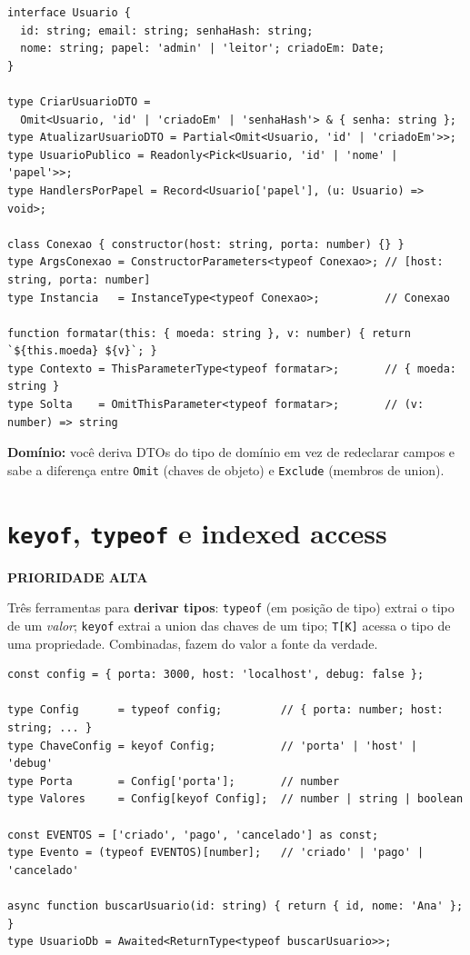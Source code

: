 \documentclass[12pt,a4paper,oneside]{book}
\newcommand{\alta}{\colorbox{red!15}{\sffamily\scriptsize\bfseries PRIORIDADE ALTA}}
\newcommand{\code}[1]{\texttt{#1}}
\newcommand{\dom}[1]{\begin{dominio}\textbf{Domínio:} #1\end{dominio}}
\begin{document}
\begin{verbatim}
interface Usuario {
  id: string; email: string; senhaHash: string;
  nome: string; papel: 'admin' | 'leitor'; criadoEm: Date;
}

type CriarUsuarioDTO =
  Omit<Usuario, 'id' | 'criadoEm' | 'senhaHash'> & { senha: string };
type AtualizarUsuarioDTO = Partial<Omit<Usuario, 'id' | 'criadoEm'>>;
type UsuarioPublico = Readonly<Pick<Usuario, 'id' | 'nome' | 'papel'>>;
type HandlersPorPapel = Record<Usuario['papel'], (u: Usuario) => void>;

class Conexao { constructor(host: string, porta: number) {} }
type ArgsConexao = ConstructorParameters<typeof Conexao>; // [host: string, porta: number]
type Instancia   = InstanceType<typeof Conexao>;          // Conexao

function formatar(this: { moeda: string }, v: number) { return `${this.moeda} ${v}`; }
type Contexto = ThisParameterType<typeof formatar>;       // { moeda: string }
type Solta    = OmitThisParameter<typeof formatar>;       // (v: number) => string
\end{verbatim}

\dom{você deriva DTOs do tipo de domínio em vez de redeclarar campos e sabe a diferença entre \code{Omit} (chaves de objeto) e \code{Exclude} (membros de union).}

\section{\texttt{keyof}, \texttt{typeof} e indexed access}
\label{sec:keyof}
\alta

Três ferramentas para \textbf{derivar tipos}: \code{typeof} (em posição de tipo) extrai o tipo de um \emph{valor}; \code{keyof} extrai a union das chaves de um tipo; \code{T[K]} acessa o tipo de uma propriedade. Combinadas, fazem do valor a fonte da verdade.

\begin{verbatim}
const config = { porta: 3000, host: 'localhost', debug: false };

type Config      = typeof config;         // { porta: number; host: string; ... }
type ChaveConfig = keyof Config;          // 'porta' | 'host' | 'debug'
type Porta       = Config['porta'];       // number
type Valores     = Config[keyof Config];  // number | string | boolean

const EVENTOS = ['criado', 'pago', 'cancelado'] as const;
type Evento = (typeof EVENTOS)[number];   // 'criado' | 'pago' | 'cancelado'

async function buscarUsuario(id: string) { return { id, nome: 'Ana' }; }
type UsuarioDb = Awaited<ReturnType<typeof buscarUsuario>>;
\end{verbatim}
\end{document}
